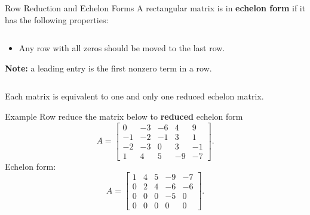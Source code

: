 \documentclass[10pt, aspectratio=169]{beamer}
\begin{document}
\begin{frame}{Row Reduction and Echelon Forms}
    A rectangular matrix is in \textbf{echelon form} if it has the following properties:
    \begin{columns}
    \begin{column}{0.5\textwidth}
    \begin{itemize}
        \item Any row with all zeros should be moved to the last row.
    \end{itemize}
    \textbf{Note:} a leading entry is the first nonzero term in a row.
    \end{column}

    \begin{column}{0.5\textwidth}
    \end{column}
    \end{columns}
    \begin{theorem}
        Each matrix is equivalent to one and only one reduced echelon matrix.
    \end{theorem}
    
\end{frame}



\begin{frame}{Example}
Row reduce the matrix below to \textbf{reduced} echelon form
\[
A = \begin{bmatrix} 
0 & -3 & -6 & 4 & 9 \\
-1 & -2 & -1 & 3 & 1 \\
-2 & -3 & 0 & 3 & -1 \\
1 & 4 & 5 & -9 & -7
\end{bmatrix}.
\]
Echelon form:
\[
A = \begin{bmatrix} 
1 & 4 & 5 & -9 & -7 \\
0 & 2 & 4 & -6 & -6 \\
0 & 0 & 0 & -5 &  0 \\
0 & 0 & 0 &  0 &  0
\end{bmatrix}.
\]    
\end{frame}
\end{document}
